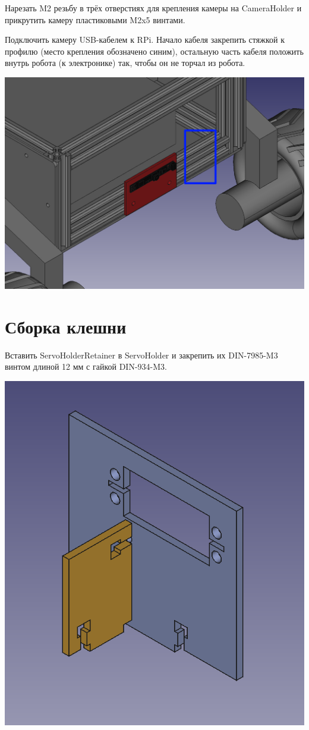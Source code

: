 \documentclass[12pt,a4paper,oneside]{article}
\begin{document}
Нарезать M2 резьбу в трёх отверстиях для крепления камеры на CameraHolder и
прикрутить камеру пластиковыми M2x5 винтами.

Подключить камеру USB-кабелем к RPi. Начало кабеля закрепить стяжкой к профилю
(место крепления обозначено синим), остальную часть кабеля положить внутрь робота (к электронике)
так, чтобы он не торчал из робота.

\includegraphics[width=\textwidth]{usb}

\section{Сборка клешни}
Вставить ServoHolderRetainer в ServoHolder и закрепить их DIN-7985-M3 винтом
длиной 12 мм с гайкой DIN-934-M3.

\includegraphics[width=\textwidth]{servoholder}
\end{document}
